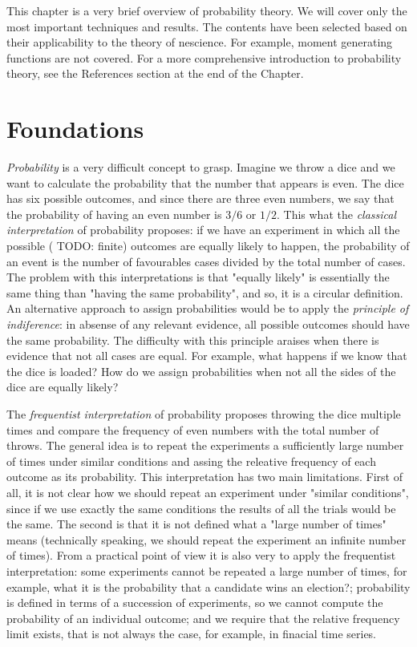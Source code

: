 This chapter is a very brief overview of probability theory. We will cover only the most important techniques and results. The contents have been selected based on their applicability to the theory of nescience. For example, moment generating functions are not covered. For a more comprehensive introduction to probability theory, see the References section at the end of the Chapter.

%
%

\section{Foundations}
\label{sec:probability_foundations}

\emph{Probability} is a very difficult concept to grasp. Imagine we throw a dice and we want to calculate the probability that the number that appears is even. The dice has six possible outcomes, and since there are three even numbers, we say that the probability of having an even number is $3/6$ or $1/2$. This what the \emph{classical interpretation} of probability proposes: if we have an experiment in which all the possible {(\color{red} TODO: finite)} outcomes are equally likely to happen, the probability of an event is the number of favourables cases divided by the total number of cases. The problem with this interpretations is that "equally likely" is essentially the same thing than "having the same probability", and so, it is a circular definition. An alternative approach to assign probabilities would be to apply the \emph{principle of indiference}: in absense of any relevant evidence, all possible outcomes should have the same probability. The difficulty with this principle araises when there is evidence that not all cases are equal. For example, what happens if we know that the dice is loaded? How do we assign probabilities when not all the sides of the dice are equally likely?

The \emph{frequentist interpretation} of probability proposes throwing the dice multiple times and compare the frequency of even numbers with the total number of throws. The general idea is to repeat the experiments a sufficiently large number of times under similar conditions and assing the releative frequency of each outcome as its probability. This interpretation has two main limitations. First of all, it is not clear how we should repeat an experiment under "similar conditions", since if we use exactly the same conditions the results of all the trials would be the same. The second is that it is not defined what a "large number of times" means (technically speaking, we should repeat the experiment an infinite number of times). From a practical point of view it is also very to apply the frequentist interpretation: some experiments cannot be repeated a large number of times, for example, what it is the probability that a candidate wins an election?; probability is defined in terms of a succession of experiments, so we cannot compute the probability of an individual outcome; and we require that the relative frequency limit exists, that is not always the case, for example, in finacial time series.

